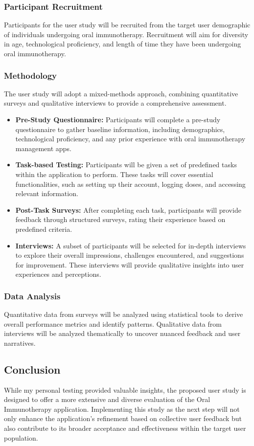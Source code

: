 \subsubsection{Participant Recruitment}

Participants for the user study will be recruited from the target user demographic of individuals undergoing oral immunotherapy. Recruitment will aim for diversity in age, technological proficiency, and length of time they have been undergoing oral immunotherapy.

\subsubsection{Methodology}

The user study will adopt a mixed-methods approach, combining quantitative surveys and qualitative interviews to provide a comprehensive assessment.

\begin{itemize}
    \item \textbf{Pre-Study Questionnaire:} Participants will complete a pre-study questionnaire to gather baseline information, including demographics, technological proficiency, and any prior experience with oral immunotherapy management apps.
    \item \textbf{Task-based Testing:} Participants will be given a set of predefined tasks within the application to perform. These tasks will cover essential functionalities, such as setting up their account, logging doses, and accessing relevant information.
    \item \textbf{Post-Task Surveys:} After completing each task, participants will provide feedback through structured surveys, rating their experience based on predefined criteria.
    \item \textbf{Interviews:} A subset of participants will be selected for in-depth interviews to explore their overall impressions, challenges encountered, and suggestions for improvement. These interviews will provide qualitative insights into user experiences and perceptions.
\end{itemize}

\subsubsection{Data Analysis}

Quantitative data from surveys will be analyzed using statistical tools to derive overall performance metrics and identify patterns. Qualitative data from interviews will be analyzed thematically to uncover nuanced feedback and user narratives.

\subsection{Conclusion}

While my personal testing provided valuable insights, the proposed user study is designed to offer a more extensive and diverse evaluation of the Oral Immunotherapy application. Implementing this study as the next step will not only enhance the application's refinement based on collective user feedback but also contribute to its broader acceptance and effectiveness within the target user population.
